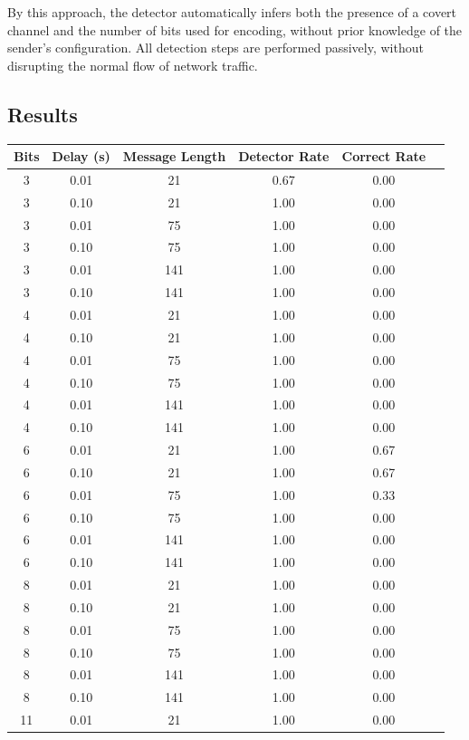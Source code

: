\documentclass[10pt,a4paper]{article}
\begin{document}
By this approach, the detector automatically infers both the presence of a covert channel and the number of bits used for encoding, without prior knowledge of the sender's configuration.
All detection steps are performed passively, without disrupting the normal flow of network traffic.

\subsection*{Results}


\begin{table}[H]
\centering
\begin{tabular}{cccccc}
\toprule
Bits & Delay (s) & Message Length & Detector Rate & Correct Rate \\
\midrule
3  & 0.01 & 21  & 0.67 & 0.00 \\
3  & 0.10 & 21  & 1.00 & 0.00 \\
3  & 0.01 & 75  & 1.00 & 0.00 \\
3  & 0.10 & 75  & 1.00 & 0.00 \\
3  & 0.01 & 141 & 1.00 & 0.00 \\
3  & 0.10 & 141 & 1.00 & 0.00 \\
4  & 0.01 & 21  & 1.00 & 0.00 \\
4  & 0.10 & 21  & 1.00 & 0.00 \\
4  & 0.01 & 75  & 1.00 & 0.00 \\
4  & 0.10 & 75  & 1.00 & 0.00 \\
4  & 0.01 & 141 & 1.00 & 0.00 \\
4  & 0.10 & 141 & 1.00 & 0.00 \\
6  & 0.01 & 21  & 1.00 & 0.67 \\
6  & 0.10 & 21  & 1.00 & 0.67 \\
6  & 0.01 & 75  & 1.00 & 0.33 \\
6  & 0.10 & 75  & 1.00 & 0.00 \\
6  & 0.01 & 141 & 1.00 & 0.00 \\
6  & 0.10 & 141 & 1.00 & 0.00 \\
8  & 0.01 & 21  & 1.00 & 0.00 \\
8  & 0.10 & 21  & 1.00 & 0.00 \\
8  & 0.01 & 75  & 1.00 & 0.00 \\
8  & 0.10 & 75  & 1.00 & 0.00 \\
8  & 0.01 & 141 & 1.00 & 0.00 \\
8  & 0.10 & 141 & 1.00 & 0.00 \\
11 & 0.01 & 21  & 1.00 & 0.00 \\

\end{tabular}
\end{table}
\end{document}

